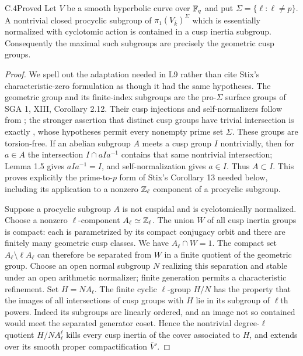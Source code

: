 \begin{claim}{C.4}{Proved}
Let $V$ be a smooth hyperbolic curve over $\mathbb F_q$ and put
$\Sigma=\{\ell:\ell\ne p\}$. A nontrivial closed procyclic subgroup of
$\pi_1(V_{\bar k})^\Sigma$ which is essentially normalized with cyclotomic
action is contained in a cusp inertia subgroup. Consequently the maximal
such subgroups are precisely the geometric cusp groups.
\end{claim}
\begin{proof}
We spell out the adaptation needed in L9 rather than cite Stix's
characteristic-zero formulation as though it had the same hypotheses.
The geometric group and its finite-index subgroups are the pro-$\Sigma$
surface groups of SGA 1, XIII, Corollary 2.12. Their cusp injections and
self-normalizers follow from \citet[Proposition 1.2]{BC_MochComb};
the stronger assertion that distinct cusp groups have trivial intersection
is exactly \citet[Lemma 1.5]{BC_HMNodes}, whose hypotheses permit every
nonempty prime set $\Sigma$. These groups are torsion-free. If an abelian
subgroup $A$ meets a cusp group $I$ nontrivially, then for $a\in A$ the
intersection $I\cap aIa^{-1}$ contains that same nontrivial intersection;
Lemma 1.5 gives $aIa^{-1}=I$, and self-normalization gives $a\in I$.
Thus $A\subset I$. This proves explicitly the prime-to-$p$ form of
Stix's Corollary 13 needed below, including its application to a nonzero
$\mathbb Z_\ell$ component of a procyclic subgroup.

Suppose a procyclic subgroup $A$ is not cuspidal and is cyclotomically
normalized. Choose a nonzero $\ell$-component $A_\ell\simeq\mathbb Z_\ell$.
The union $W$ of all cusp inertia groups is compact: each is parametrized
by its compact conjugacy orbit and there are finitely many geometric cusp
classes. We have $A_\ell\cap W=1$. The compact set
$A_\ell\setminus\ell A_\ell$ can therefore be separated from $W$ in a
finite quotient of the geometric group. Choose an open normal subgroup
$N$ realizing this separation and stable under an open arithmetic
normalizer; finite generation permits a characteristic refinement.
Set $H=NA_\ell$. The finite cyclic $\ell$-group $H/N$ has the property
that the images of all intersections of cusp groups with $H$ lie in its
subgroup of $\ell$th powers.
Indeed its subgroups are linearly ordered, and an image not so contained
would meet the separated generator coset. Hence the nontrivial degree-$\ell$
quotient $H/NA_\ell^\ell$ kills every cusp inertia of the cover associated
to $H$, and extends over its smooth proper compactification $\bar V'$.


\end{proof}
